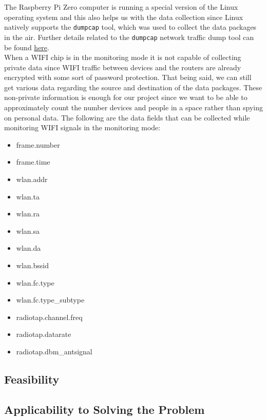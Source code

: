 \documentclass[journal, 11pt]{IEEEtran}
\begin{document}
\noindent The  Raspberry Pi Zero computer is running a special version of the Linux operating system and this also helps us with the data collection since Linux natively supports the \texttt{dumpcap} tool, which was used to collect the data packages in the air. Further details related to the \texttt{dumpcap} network traffic dump tool can be found  \href{https://linux.die.net/man/1/dumpcap}{here}.\\

\noindent When a WIFI chip is in the monitoring mode it is not capable of collecting private data since WIFI traffic between devices and the routers are already encrypted with some sort of password protection. That being said, we can still get various data regarding the source and destination of the data packages. These non-private information is enough for our project since we want to be able to approximately count the number devices and people in a space rather than spying on personal data. The following are the data fields that can be collected while monitoring WIFI signals in the monitoring mode:

\begin{itemize}
    \item frame.number
    \item frame.time
    \item wlan.addr
    \item wlan.ta
    \item wlan.ra
    \item wlan.sa
    \item wlan.da
    \item wlan.bssid
    \item wlan.fc.type
    \item wlan.fc.type\_subtype
    \item radiotap.channel.freq
    \item radiotap.datarate
    \item radiotap.dbm\_antsignal
\end{itemize}

\noindent 


\subsection{Feasibility}






\subsection{Applicability to Solving the Problem}





\printbibliography
\end{document}
